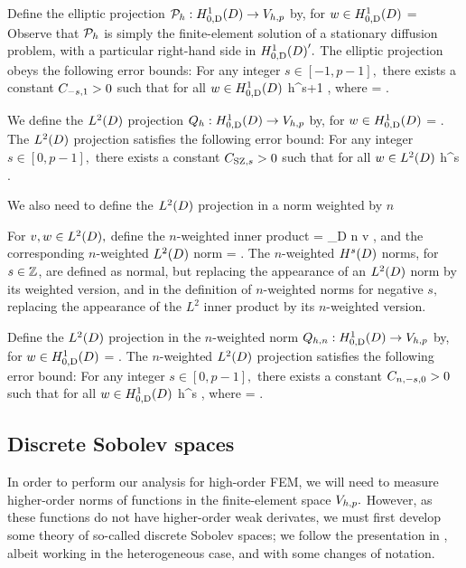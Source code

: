 Define the elliptic projection $\Ph:\HozDD\rightarrow\Vhp$ by, for $w \in \HozDD$
\beqs
{} =  \tforall \vh \in \Vhp
\eeqs
Observe that $\mathcal P_{h}$ is simply the finite-element solution of a stationary diffusion problem, with a particular right-hand side in $\HozDD'.$
The elliptic projection obeys the following error bounds:
\label{lem:ellprojerr}
For any integer $s \in [-1,p-1],$ there exists a constant $C_{-s,1} >0$ such that for all $w \in \HozDD$
\beq\label{eq:ellprojerr}
 \leq \Cmso h^{s+1} ,
\eeq
where
\beqs
\Cmso = \CSZs.
\eeqs
\ele

We define the $\LtD$ projection $\Qh:\HozDD\rightarrow \Vhp$ by, for $w \in \HozDD$
\beqs
{} =  \tforall \vh \in \Vhp.
\eeqs
The $\LtD$ projection satisfies the following error bound:
\label{lem:ltdprojerr}
For any integer $s \in [0,p-1],$ there exists a constant $C_{\mathrm{SZ},s} >0$ such that for all $w \in \LtD$
\beqs
{} \leq \Cmsz h^{s} .
\eeqs
\ele

We also need to define the $\LtD$ projection in a norm weighted by $n$

For $v,w \in \LtD,$ define the $n$-weighted inner product
\beqs
{} = \int_{D} n v \wbar,
\eeqs
and the corresponding $n$-weighted $\LtD$ norm
\beqs
{} = .
\eeqs
The $n$-weighted $\HsD$ norms, for $s \in \mathbb Z$, are defined as normal, but replacing the appearance of an $\LtD$ norm by its weighted version, and in the definition of $n$-weighted norms for negative $s,$ replacing the appearance of the $L^2$ inner product by its $n$-weighted version.

Define the $\LtD$ projection in the $n$-weighted norm $\Qhn:\HozDD\rightarrow \Vhp$ by, for $w \in \HozDD$
\beqs
{} =  \tforall \vh \in \Vhp.
\eeqs
The $n$-weighted $\LtD$ projection satisfies the following error bound:
\label{lem:wltdprojerr}
For any integer $s \in [0,p-1],$ there exists a constant $C_{n,-s,0} >0$ such that for all $w \in \HozDD$
\beq\label{eq:wltdprojerr}
 \leq \Cnmsz h^{s} ,
\eeq
where
\beqs
\Cnmsz = \CSZs.
\eeqs
\ele

\subsection{Discrete Sobolev spaces}\label{sec:discsob}
In order to perform our analysis for high-order FEM, we will need to measure higher-order norms of functions in the finite-element space $V_{h,p}.$ However, as these functions do not have higher-order weak derivates, we must first develop some theory of so-called discrete Sobolev spaces; we follow the presentation in \cite{DuWu:15}, albeit working in the heterogeneous case, and with some changes of notation.

